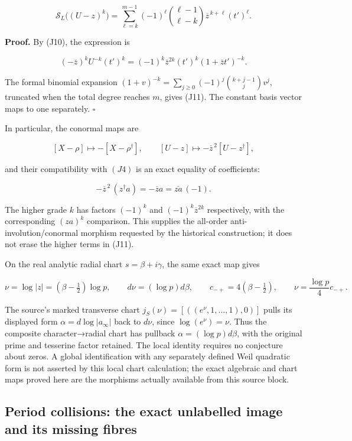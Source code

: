 \[
\boxed{
\mathcal S_L\bigl((U-z)^k\bigr)
=\sum_{\ell=k}^{m-1}(-1)^\ell
\binom{\ell-1}{\ell-k}
\overline z^{\,k+\ell}(t')^\ell.
}\tag{J11}
\]

\textbf{Proof.} By (J10), the expression is

\[
(-\overline z)^k U^{-k}(t')^k
=(-1)^k\overline z^{2k}(t')^k(1+\overline z t')^{-k}.
\]

The formal binomial expansion \((1+v)^{-k}=\sum_{j\ge0}(-1)^j\binom{k+j-1}{j}v^j\), truncated when the total degree reaches \(m\), gives (J11). The constant basis vector maps to one separately. \(\square\)

In particular, the conormal maps are

\[
[X-\rho]\longmapsto-[X-\rho^\dagger],
\qquad
[U-z]\longmapsto-\overline z^{\,2}[U-z^\dagger],
\tag{J12}
\]

and their compatibility with \((J4)\) is an exact equality of coefficients:

\[
-\overline z^{\,2}\,(z^\dagger a)
=-\overline z a
=\overline{za}\,(-1).
\]

The higher grade \(k\) has factors \((-1)^k\) and \((-1)^k\overline z^{2k}\) respectively, with the corresponding \((za)^k\) comparison. This supplies the all-order anti-involution/conormal morphism requested by the historical construction; it does not erase the higher terms in (J11).

On the real analytic radial chart \(s=\beta +i\gamma\), the same exact map gives

\[
\nu=\log|z|=(\beta-\tfrac12)\log p,
\qquad d\nu=(\log p)d\beta,
\qquad c_{-+}=4(\beta-\tfrac12),
\qquad\nu=\frac{\log p}{4}c_{-+}.
\tag{J13}
\]

The source's marked transverse chart \(j_S(\nu )=[((e^\nu ,1,\ldots ,1),0)]\) pulls its displayed form \(\alpha =d \log|a_\infty |\) back to \(d\nu\), since \(\log(e^\nu )=\nu\). Thus the composite character→radial chart has pullback \(\alpha =(\log p)d\beta\), with the original prime and tesserine factor retained. The local identity requires no conjecture about zeros. A global identification with any separately defined Weil quadratic form is not asserted by this local chart calculation; the exact algebraic and chart maps proved here are the morphisms actually available from this source block.

\subsection{Period collisions: the exact unlabelled image and its missing fibres}\label{period-collisions-the-exact-unlabelled-image-and-its-missing-fibres}

